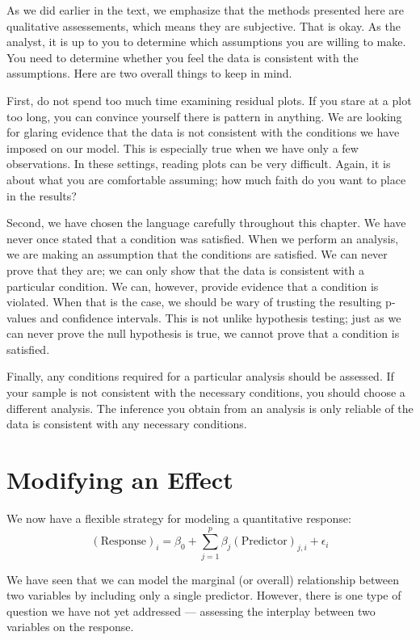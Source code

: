 \documentclass[]{book}
\theoremstyle{definition}
\theoremstyle{definition}
\theoremstyle{definition}
\theoremstyle{remark}
\begin{document}
As we did earlier in the text, we emphasize that the methods presented
here are qualitative assessements, which means they are subjective. That
is okay. As the analyst, it is up to you to determine which assumptions
you are willing to make. You need to determine whether you feel the data
is consistent with the assumptions. Here are two overall things to keep
in mind.

First, do not spend too much time examining residual plots. If you stare
at a plot too long, you can convince yourself there is pattern in
anything. We are looking for glaring evidence that the data is not
consistent with the conditions we have imposed on our model. This is
especially true when we have only a few observations. In these settings,
reading plots can be very difficult. Again, it is about what you are
comfortable assuming; how much faith do you want to place in the
results?

Second, we have chosen the language carefully throughout this chapter.
We have never once stated that a condition was satisfied. When we
perform an analysis, we are making an assumption that the conditions are
satisfied. We can never prove that they are; we can only show that the
data is consistent with a particular condition. We can, however, provide
evidence that a condition is violated. When that is the case, we should
be wary of trusting the resulting p-values and confidence intervals.
This is not unlike hypothesis testing; just as we can never prove the
null hypothesis is true, we cannot prove that a condition is satisfied.

Finally, any conditions required for a particular analysis should be
assessed. If your sample is not consistent with the necessary
conditions, you should choose a different analysis. The inference you
obtain from an analysis is only reliable of the data is consistent with
any necessary conditions.

\chapter{Modifying an Effect}\label{Reginteractions}

We now have a flexible strategy for modeling a quantitative response:
\[(\text{Response})_i = \beta_0 + \sum_{j=1}^{p} \beta_j (\text{Predictor})_{j,i} + \epsilon_i\]

We have seen that we can model the marginal (or overall) relationship
between two variables by including only a single predictor. However,
there is one type of question we have not yet addressed --- assessing
the interplay between two variables on the response.
\end{document}

